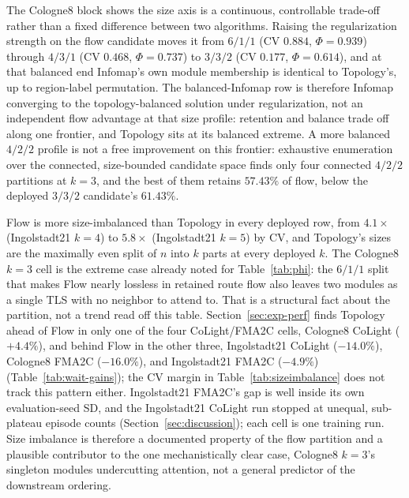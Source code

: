 \documentclass[journal]{IEEEtran}
\theoremstyle{definition}
\begin{document}
The Cologne8 block shows the size axis is a continuous, controllable trade-off rather than a fixed difference between two algorithms. Raising the regularization strength on the flow candidate moves it from $6/1/1$ (CV $0.884$, $\Phi=0.939$) through $4/3/1$ (CV $0.468$, $\Phi=0.737$) to $3/3/2$ (CV $0.177$, $\Phi=0.614$), and at that balanced end Infomap's own module membership is identical to Topology's, up to region-label permutation. The balanced-Infomap row is therefore Infomap converging to the topology-balanced solution under regularization, not an independent flow advantage at that size profile: retention and balance trade off along one frontier, and Topology sits at its balanced extreme. A more balanced $4/2/2$ profile is not a free improvement on this frontier: exhaustive enumeration over the connected, size-bounded candidate space finds only four connected $4/2/2$ partitions at $k=3$, and the best of them retains $57.43\%$ of flow, below the deployed $3/3/2$ candidate's $61.43\%$.

Flow is more size-imbalanced than Topology in every deployed row, from $4.1\times$ (Ingolstadt21 $k=4$) to $5.8\times$ (Ingolstadt21 $k=5$) by CV, and Topology's sizes are the maximally even split of $n$ into $k$ parts at every deployed $k$. The Cologne8 $k=3$ cell is the extreme case already noted for Table~\ref{tab:phi}: the $6/1/1$ split that makes Flow nearly lossless in retained route flow also leaves two modules as a single TLS with no neighbor to attend to. That is a structural fact about the partition, not a trend read off this table.
Section~\ref{sec:exp-perf} finds Topology ahead of Flow in only one of the four CoLight/FMA2C cells, Cologne8 CoLight ($+4.4\%$), and behind Flow in the other three, Ingolstadt21 CoLight ($-14.0\%$), Cologne8 FMA2C ($-16.0\%$), and Ingolstadt21 FMA2C ($-4.9\%$) (Table~\ref{tab:wait-gains}); the CV margin in Table~\ref{tab:sizeimbalance} does not track this pattern either. Ingolstadt21 FMA2C's gap is well inside its own evaluation-seed SD, and the Ingolstadt21 CoLight run stopped at unequal, sub-plateau episode counts (Section~\ref{sec:discussion}); each cell is one training run. Size imbalance is therefore a documented property of the flow partition and a plausible contributor to the one mechanistically clear case, Cologne8 $k=3$'s singleton modules undercutting attention, not a general predictor of the downstream ordering.
\end{document}
